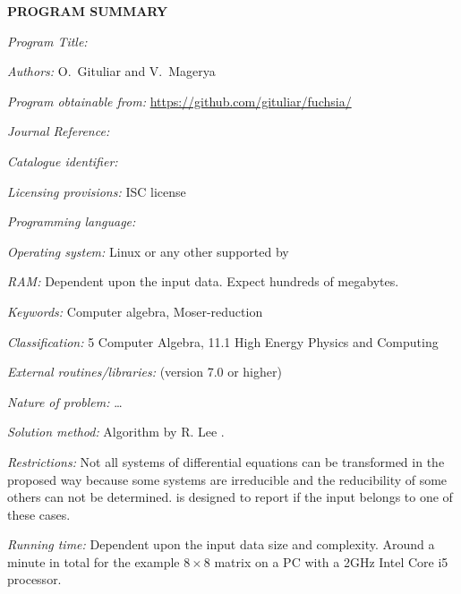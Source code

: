 {\bf PROGRAM SUMMARY}

\begin{small}
\noindent

{\em Program Title:}
    \fuchsia{}

{\em Authors:}
    O.~Gituliar and V.~Magerya

{\em Program obtainable from:}
    \url{https://github.com/gituliar/fuchsia/}

{\em Journal Reference:}

{\em Catalogue identifier:}

{\em Licensing provisions:}
    ISC license

{\em Programming language:}

{\em Operating system:}
    Linux or any other supported by \sage

{\em RAM:}
    Dependent upon the input data. Expect hundreds of megabytes.

{\em Keywords:}
    Computer algebra, Moser-reduction

{\em Classification:}
    5 Computer Algebra, 11.1 High Energy Physics and Computing

{\em External routines/libraries:}
    \href{http://www.sagemath.org/}{\sage} (version 7.0 or higher)

{\em Nature of problem:}
    \ldots{}

{\em Solution method:}
    Algorithm by R. Lee \cite{Lee15}.

{\em Restrictions:}
    Not all systems of differential equations can be transformed
    in the proposed way because some systems are irreducible
    and the reducibility of some others can not be determined.
    \fuchsia{} is designed to report if the input belongs to
    one of these cases.

{\em Running time:}
    Dependent upon the input data size and complexity. Around
    a minute in total for the example $8\times8$ matrix on a PC
    with a 2GHz Intel Core i5 processor.

\end{small}
